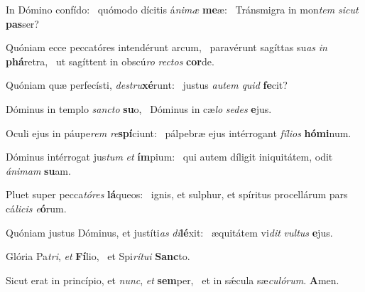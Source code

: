\item In Dómino confído:~\pscross{} quómodo dícitis á\textit{nimæ} \textbf{me}æ:~\psstar{} Tránsmigra in mon\textit{tem} \textit{sicut} \textbf{pas}ser?
\item Quóniam ecce peccatóres intendérunt arcum,~\pscross{} paravérunt sagíttas su\textit{as} \textit{in} \textbf{phá}retra,~\psstar{} ut sagíttent in obscú\textit{ro} \textit{rectos} \textbf{cor}de.
\item Quóniam quæ perfecísti, \textit{destru}\textbf{xé}runt:~\psstar{} justus \textit{autem} \textit{quid} \textbf{fe}cit?
\item Dóminus in templo \textit{sancto} \textbf{su}o,~\psstar{} Dóminus in cæ\textit{lo} \textit{sedes} \textbf{e}jus.
\item Oculi ejus in páupe\textit{rem} \textit{re}\textbf{spí}ciunt:~\psstar{} pálpebræ ejus intérrogant \textit{fílios} \textbf{hó}\textbf{mi}num.
\item Dóminus intérrogat jus\textit{tum} \textit{et} \textbf{ím}pium:~\psstar{} qui autem díligit iniquitátem, odit \textit{ánimam} \textbf{su}am.
\item Pluet super pecca\textit{tóres} \textbf{lá}queos:~\psstar{} ignis, et sulphur, et spíritus procellárum pars cá\textit{licis} \textit{e}\textbf{ó}rum.
\item Quóniam justus Dóminus, et justíti\textit{as} \textit{di}\textbf{lé}xit:~\psstar{} æquitátem vi\textit{dit} \textit{vultus} \textbf{e}jus.
\item Glória Pa\textit{tri}, \textit{et} \textbf{Fí}lio,~\psstar{} et Spi\textit{rítui} \textbf{Sanc}to.
\item Sicut erat in princípio, et \textit{nunc}, \textit{et} \textbf{sem}per,~\psstar{} et in sǽcula sæ\textit{culórum}. \textbf{A}men.
